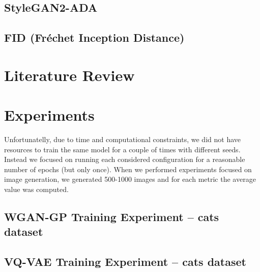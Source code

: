 \documentclass{article}
\begin{document}
\subsection{StyleGAN2-ADA}

\subsection{FID (Fr\'echet Inception Distance)}

\section{Literature Review}

\section{Experiments}

Unfortunatelly, due to time and computational constraints, we did not have resources to train the same model for a couple of times with different seeds. Instead we focused on running each considered configuration for a reasonable number of epochs (but only once). When we performed experiments 
focused on image generation, we generated 500-1000 images and for each metric the average value was computed.

\subsection{WGAN-GP Training Experiment -- cats dataset}

\subsection{VQ-VAE Training Experiment -- cats dataset}


\end{document}
